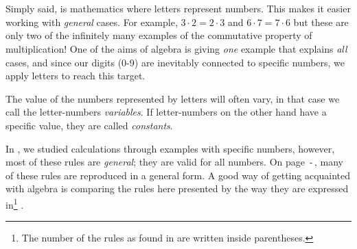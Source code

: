 




\section{\algintro}
Simply said,  is mathematics where letters represent numbers. This makes it easier working with \textsl{general} cases. For example, $ 3\cdot 2=2\cdot3 $ and $ {6\cdot7=7\cdot6} $ but these are only two of the infinitely many examples of the commutative property of multiplication! One of the aims of algebra is giving \textsl{one} example that explains \textsl{all} cases, and since our digits (0-9) are inevitably connected to specific numbers, we apply letters to reach this target. \vsk

The value of the numbers represented by letters will often vary, in that case we call the letter-numbers \textit{variables}. If letter-numbers on the other hand have a specific value, they are called \textit{constants}.

\vsk

In , we studied calculations through examples with specific numbers, however, most of these rules are \textsl{general}; they are valid for all numbers. On page \pageref{regstart}\,-\,\pageref{regslutt}, many of these rules are reproduced in a general form. A good way of getting acquainted with algebra is comparing the rules here presented by the way they are expressed in\footnote{The number of the rules as found in  are written inside parentheses.} . \vsk

\regv
\label{regstart}
\reg[\adkom\;(\ref{adkom}) \label{adkomalg}]{\vs
\[ a+ b =b+a \]
}
\eks{ \vsb
\[ 7+ 5=5+7 \]
} \vsk \vsk

\reg[\gangkom\;(\ref{gangkom})]{\vs
	\[ a\cdot b =b\cdot a \]
}
\eks[1]{ \vsb
	\[ 9\cdot 8=8\cdot9 \]
}
\eks[2]{ \vsb
\[  8\cdot a= a\cdot 8  \]
}
\newpage
{}
\vsk 

\reg[\brdef\;(\ref{brdef})]{
\[ a:b=\frac{a}{b} \]
}
\eks[]{ \vs
\[a:2= \frac{a}{2} \]
}
 \vsk 

